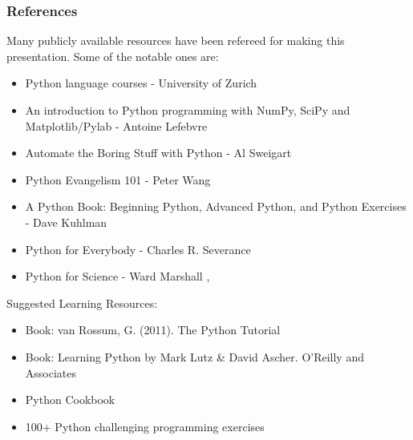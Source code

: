 \begin{frame}\frametitle{References}
Many publicly available resources have been refereed for making this presentation. Some of the notable ones are:
\scriptsize
\begin{itemize}
\item Python language courses - University of Zurich%
\item An introduction to Python programming with NumPy, SciPy and Matplotlib/Pylab - Antoine Lefebvre
\item Automate the Boring Stuff with Python - Al Sweigart %
\item Python Evangelism 101 - Peter Wang %
\item A Python Book: Beginning Python, Advanced Python, and Python Exercises - Dave Kuhlman%
\item Python for Everybody - Charles R. Severance
\item Python for Science - Ward Marshall ,%
\end{itemize}
Suggested Learning Resources:
\begin{itemize}
\item Book: van Rossum, G. (2011). The Python Tutorial %
\item Book: Learning Python by Mark Lutz \& David Ascher. O'Reilly and Associates
\item Python Cookbook %
\item 100+ Python challenging programming exercises
\end{itemize}
\end{frame}
